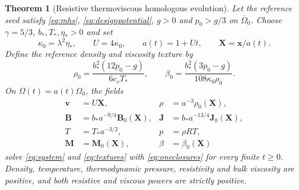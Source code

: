\documentclass[11pt,a4paper]{article}
\newtheorem{theorem}{Theorem}
\theoremstyle{remark}\newtheorem{remark}{Remark}
\numberwithin{equation}{section}
\newcommand{\vv}{\boldsymbol v}
\newcommand{\BB}{\boldsymbol B}
\newcommand{\JJ}{\boldsymbol J}
\newcommand{\MM}{\boldsymbol M}
\newcommand{\xx}{\boldsymbol x}
\newcommand{\XX}{\boldsymbol X}
\begin{document}
\begin{theorem}[Resistive thermoviscous homologous evolution]\label{thm:oneT}
Let the reference seed satisfy \eqref{eq:mhs}, \eqref{eq:designpotential}, $g>0$ and $p_0>g/3$ on $\overline\Omega_0$. Choose $\gamma=5/3$, $b_*,T_*,\eta_*>0$ and set
\begin{equation}
\kappa_0=\lambda^2\eta_*,\qquad U=4\kappa_0,\qquad
a(t)=1+Ut,\qquad \XX=\xx/a(t).
\label{eq:scale}
\end{equation}
Define the reference density and viscosity texture by
\begin{equation}
\rho_0=\frac{b_*^2(12p_0-g)}{6c_vT_*},\qquad
\beta_0=\frac{b_*^2(3p_0-g)}{108\kappa_0\rho_0}.
\label{eq:materialdata}
\end{equation}
On $\Omega(t)=a(t)\Omega_0$, the fields
\begin{equation}
\begin{aligned}
\vv&=U\XX,&\rho&=a^{-3}\rho_0(\XX),\\
\BB&=b_*a^{-9/4}\BB_0(\XX),&\JJ&=b_*a^{-13/4}\JJ_0(\XX),\\
T&=T_*a^{-3/2},&p&=\rho RT,\\
\MM&=\MM_0(\XX),&\beta&=\beta_0(\XX)
\end{aligned}
\label{eq:onesolution}
\end{equation}
solve \eqref{eq:system} and \eqref{eq:textures} with \eqref{eq:oneclosures} for every finite $t\ge0$. Density, temperature, thermodynamic pressure, resistivity and bulk viscosity are positive, and both resistive and viscous powers are strictly positive.
\end{theorem}
\end{document}
